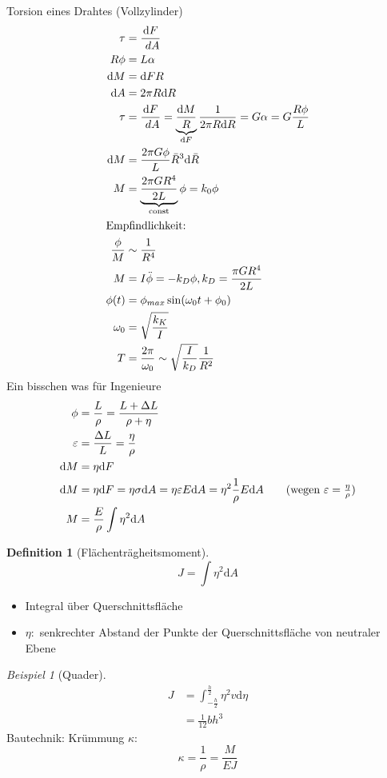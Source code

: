 \documentclass[a4paper]{scrartcl}
\renewcommand{\d}{\mathrm{d}}
\newcommand{\dd}[2]{\frac{\d #1}{\ d#2}}
\theoremstyle{definition}
\newtheorem{defn}{Definition}
\theoremstyle{plain}
\theoremstyle{plain}
\theoremstyle{remark}
\theoremstyle{remark}
\theoremstyle{remark}
\newtheorem{ex}{Beispiel}
\newcommand{\eps}{\ensuremath{\varepsilon}}%
\begin{document}
Torsion eines Drahtes (Vollzylinder)
\begin{align*}
\tau &= \dd{F}{A} \\
R \phi &= L \alpha \\
\d M &= \d F R \\
\d A &= 2\pi R \d R \\
\tau &= \dd{F}{A} = \underbrace{\frac{\d M}{R}}_{\d F} \frac{1}{2\pi R \d R} = G \alpha = G \frac{R \phi}{L} \\
\d M &= \frac{2\pi G \phi}{L} \bar R^3 \d \bar R \\
M &= \underbrace{\frac{2\pi G R^4}{2 L}}_{\text{const}} \phi = k_0 \phi \\
\intertext{Empfindlichkeit:}
\frac{\phi}{M} &\sim \frac{1}{R^4} \\
M &= I \ddot{\phi} = -k_D \phi, k_D = \frac{\pi G R^4}{2L} \\
\phi(t) &= \phi_{max} \sin(\omega_0 t + \phi_0) \\
\omega_0 &= \sqrt{\frac{k_K}{I}} \\
T &= \frac{2\pi}{\omega_0} \sim \sqrt{\frac{I}{k_D}} \frac{1}{R^2} \\
\end{align*}
Ein bisschen was für Ingenieure
\begin{align*}
\phi &= \frac{L}{\rho} = \frac{L + \Delta L}{\rho + \eta} \\
\eps &= \frac{\Delta L}{L} = \frac{\eta}{\rho} \\
\d M &= \eta \d F \\
\d M &= \eta \d F = \eta \sigma \d A = \eta \eps E \d A = \eta^2 \frac{1}{\rho} E \d A \tag{wegen $\eps = \frac{\eta}{\rho}$}\\
M &= \frac{E}{\rho} \int \eta^2 \d A
\end{align*}
\begin{defn}[Flächenträgheitsmoment]
\[J = \int \eta^2 \d A\]
\begin{itemize}
\item Integral über Querschnittsfläche
\item $\eta:$ senkrechter Abstand der Punkte der Querschnittsfläche von neutraler Ebene
\end{itemize}
\end{defn}
\begin{ex}[Quader]
\begin{align*}
J &= \int_{-\frac{h}{2}}^{\frac{h}{2}} \eta^2 v \d\eta \\
&= \frac{1}{12} b h^3
\end{align*}
Bautechnik:
Krümmung $\kappa$:
\[\kappa = \frac{1}{\rho} = \frac{M}{E J}\]
\end{ex}
\end{document}
